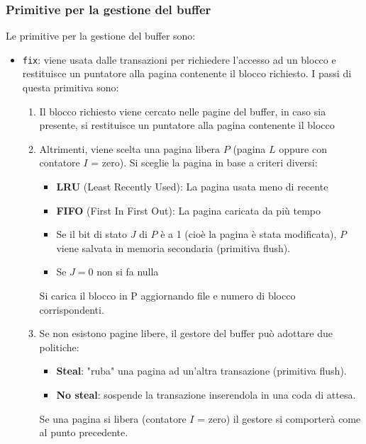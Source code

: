 \documentclass[a4paper,twoside]{article}
\begin{document}
\subsubsection{Primitive per la gestione del buffer}
Le primitive per la gestione del buffer sono:
\begin{itemize}
  \item \texttt{fix}: viene usata dalle transazioni per richiedere l'accesso ad un
    blocco e restituisce un puntatore alla pagina contenente il blocco richiesto.
    I passi di questa primitiva sono:
    \begin{enumerate}
      \item Il blocco richiesto viene cercato nelle pagine del buffer, in caso sia
        presente, si restituisce un puntatore alla pagina contenente il blocco

      \item Altrimenti, viene scelta una pagina libera \( P \) (pagina \( L \) oppure
        con contatore \( I \) = zero). Si sceglie la pagina in base a criteri diversi:
        \begin{itemize}
          \item \textbf{LRU} (Least Recently Used): La pagina usata meno di recente
          \item \textbf{FIFO} (First In First Out): La pagina caricata da più tempo
        \end{itemize}
        \begin{itemize}
          \item 
            Se il bit di stato \( J \) di \( P \) è a 1 (cioè la pagina è stata modificata),
            \( P \) viene salvata in memoria secondaria (primitiva flush).

          \item Se \( J = 0 \) non si fa nulla
        \end{itemize}
            Si carica il blocco in P aggiornando file e numero di blocco corrispondenti.
            
      \item Se non esistono pagine libere, il gestore del buffer può adottare due
        politiche:
        \begin{itemize}
          \item \textbf{Steal}: "ruba" una pagina ad un’altra transazione
            (primitiva flush).
          \item \textbf{No steal}: sospende la transazione inserendola in una coda di
            attesa.
        \end{itemize}
        Se una pagina si libera (contatore \( I \) = zero) il gestore si comporterà
        come al punto precedente.


\end{enumerate}
\end{itemize}
\end{document}
